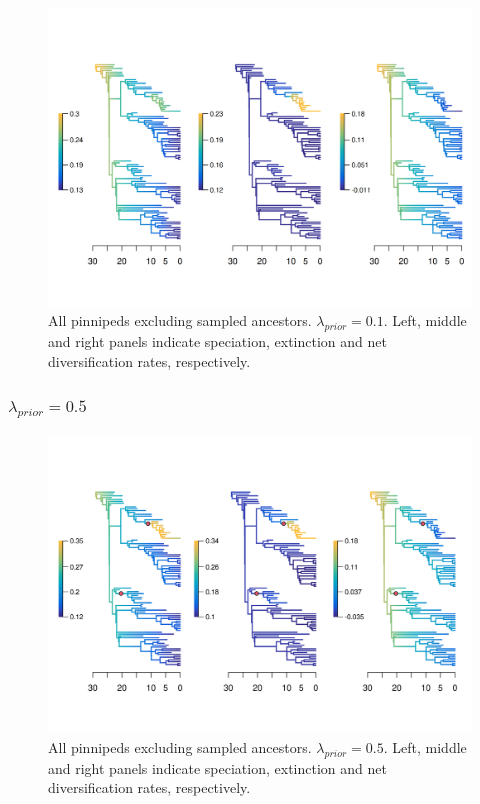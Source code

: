\documentclass[a4paper, 12pt]{article}
\begin{document}
\begin{figure}[H]
  \centering
  \includegraphics[width = \linewidth]{figures/diversification/sensitivity-analyses/shifts-0-1/sensitivity-analysis-noanc-0-1.png}
  \caption{All pinnipeds excluding sampled ancestors. $\lambda_{prior} = 0.1$. Left, middle and right panels indicate speciation, extinction and net diversification rates, respectively.}
  \label{fig-noanc-0-1}
\end{figure}

\subsubsection{$\lambda_{prior} = 0.5$}

\begin{figure}[H]
  \centering
  \includegraphics[width = \linewidth]{figures/diversification/sensitivity-analyses/shifts-0-5/sensitivity-analysis-noanc-0-5.png}
  \caption{All pinnipeds excluding sampled ancestors. $\lambda_{prior} = 0.5$. Left, middle and right panels indicate speciation, extinction and net diversification rates, respectively.}
  \label{fig-noanc-0-5}
\end{figure}
\end{document}
